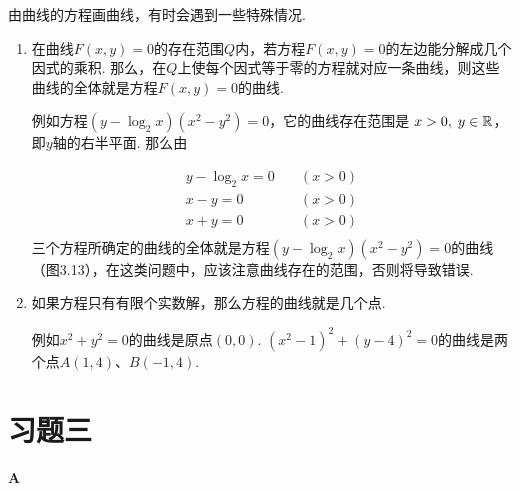由曲线的方程画曲线，有时会遇到一些特殊情况.
\begin{enumerate}
    \item 在曲线$F(x,y)=0$的存在范围$Q$内，若方程$F(x,y)=0$的左边能分解成几个因式的乘积. 那么，在$Q$上使每个因式等于零的方程就对应一条曲线，则这些曲线的全体就是方程$F(x,y)=0$的曲线.
    
    例如方程$(y-\log_2 x)(x^2-y^2)=0$，它的曲线存在范围是
$x>0,\; y\in\mathbb{R}$，即$y$轴的右半平面. 那么由

\noindent
\begin{minipage}{.4\textwidth}

\[\begin{split}
    y-\log_2 x=0 &\quad (x>0)\\
    x-y=0 &\quad (x>0)\\
     x+y=0 &\quad (x>0)\\
\end{split}\]
三个方程所确定的曲线的全体就是方程$(y-\log_2x)(x^2-y^2)=0$的曲线（图3.13），在这类问题中，应该注意曲线存在的范围，否则将导致错误.
\end{minipage}
\hfill
\begin{minipage}{.52\textwidth}
\centering
{}
\end{minipage}

\item 如果方程只有有限个实数解，那么方程的曲线就是几个点.

例如$x^2+y^2=0$的曲线是原点$(0,0)$. $(x^2-1)^2+(y-4)^2=0$的曲线是两个点$A(1,4)$、$B(-1,4)$.
\end{enumerate}    

\section*{习题三}
\begin{center}
    \bfseries A
\end{center}


